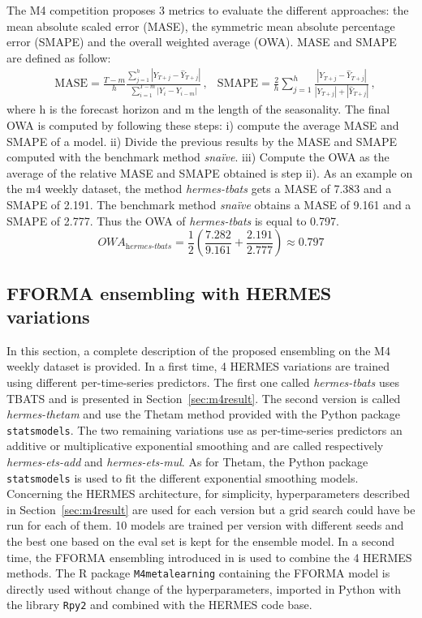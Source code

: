 \documentclass[10pt]{article} %
\begin{document}
The M4 competition proposes 3 metrics to evaluate the different approaches: the mean absolute scaled error (MASE), the symmetric mean absolute percentage error (SMAPE) and the overall weighted average (OWA). MASE and SMAPE are defined as follow:
\begin{align*}
&\mathrm{MASE} = \frac{T-m}{h}\frac{\sum_{j=1}^h |Y_{T+j} - \hat{Y}_{T+j}| }{\sum_{i=1}^{T-m} |Y_i - Y_{i-m}|}\,,
&\mathrm{SMAPE} = \frac{2}{h}\sum_{j=1}^h\frac{|Y_{T+j} - \hat{Y}_{T+j}|}{|Y_{T+j}| + |\hat{Y}_{T+j}|}\,,
\end{align*}
where h is the forecast horizon and m the length of the seasonality. The final OWA is computed by following these steps: i) compute the average MASE and SMAPE of a model. ii) Divide the previous results by the MASE and SMAPE computed with the benchmark method \textit{snaïve}. iii) Compute the OWA as the average of the relative MASE and SMAPE obtained is step ii). As an example on the m4 weekly dataset, the method \textit{hermes-tbats} gets a MASE of 7.383 and a SMAPE of 2.191. The benchmark method \textit{snaïve} obtains a MASE of 9.161 and a SMAPE of 2.777. Thus the OWA of  \textit{hermes-tbats} is equal to 0.797.
\begin{equation*}
    OWA_{\textit{hermes-tbats}} = \frac{1}{2}(\frac{7.282}{9.161} + \frac{2.191}{2.777}) \approx 0.797
\end{equation*} 

\subsection{FFORMA ensembling with HERMES variations}
\label{sec:fforma-hermes}

In this section, a complete description of the proposed ensembling on the M4 weekly dataset is provided. In a first time, 4 HERMES variations are trained using different per-time-series predictors. The first one called \textit{hermes-tbats} uses TBATS and is presented in Section~\ref{sec:m4result}. The second version is called \textit{hermes-thetam} and use the Thetam method provided with the Python package \texttt{statsmodels}. The two remaining variations use as per-time-series predictors an additive or multiplicative exponential smoothing and are called respectively \textit{hermes-ets-add} and \textit{hermes-ets-mul}. As for Thetam, the Python package \texttt{statsmodels} is used to fit the different exponential smoothing models. Concerning the HERMES architecture, for simplicity, hyperparameters described in Section~\ref{sec:m4result} are used for each version but a grid search could have be run for each of them. 10 models are trained per version with different seeds and the best one based on the eval set is kept for the ensemble model. In a second time, the FFORMA ensembling introduced in \citet{montero2020} is used to combine the 4 HERMES methods. The R package \texttt{M4metalearning} containing the FFORMA model is directly used without change of the hyperparameters, imported in Python with the library \texttt{Rpy2} and combined with the HERMES code base.
\end{document}

